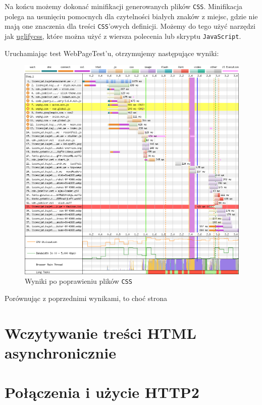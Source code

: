 \documentclass[licencjacka]{pracadypl}
\begin{document}
Na końcu możemy dokonać minifikacji generowanych plików \texttt{CSS}. Minifikacja polega na usunięciu pomocnych dla czytelności białych znaków z miejsc, gdzie nie mają one znaczenia dla treści \texttt{CSS}'owych definicji. Możemy do tego użyć narzędzi jak \href{https://www.npmjs.com/package/uglifycss}{uglifycss}, które można użyć z wiersza polecenia lub skryptu \texttt{JavaScript}.

Uruchamiając test WebPageTest'u, otrzymujemy następujące wyniki:

\begin{figure}[H]
  \centering
  \includegraphics[width=\linewidth]{images/waterfall-after-css.png}
  \caption{Wyniki po poprawieniu plików \texttt{CSS}}
  \label{fig:waterfall-after-css}
\end{figure}

Porównując z poprzednimi wynikami, to choć strona

\section{Wczytywanie treści HTML asynchronicznie}

\section{Połączenia i użycie HTTP2}
\end{document}
